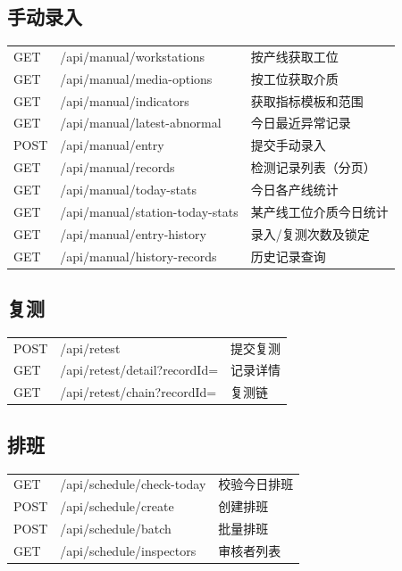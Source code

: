 \documentclass[12pt,a4paper]{ctexart}
\begin{document}
\subsection{手动录入}

\begin{tabular}{|l|l|l|}
\hline
GET & /api/manual/workstations & 按产线获取工位 \\
GET & /api/manual/media-options & 按工位获取介质 \\
GET & /api/manual/indicators & 获取指标模板和范围 \\
GET & /api/manual/latest-abnormal & 今日最近异常记录 \\
POST & /api/manual/entry & 提交手动录入 \\
GET & /api/manual/records & 检测记录列表（分页） \\
GET & /api/manual/today-stats & 今日各产线统计 \\
GET & /api/manual/station-today-stats & 某产线工位介质今日统计 \\
GET & /api/manual/entry-history & 录入/复测次数及锁定 \\
GET & /api/manual/history-records & 历史记录查询 \\
\hline
\end{tabular}

\subsection{复测}

\begin{tabular}{|l|l|l|}
\hline
POST & /api/retest & 提交复测 \\
GET & /api/retest/detail?recordId= & 记录详情 \\
GET & /api/retest/chain?recordId= & 复测链 \\
\hline
\end{tabular}

\subsection{排班}

\begin{tabular}{|l|l|l|}
\hline
GET & /api/schedule/check-today & 校验今日排班 \\
POST & /api/schedule/create & 创建排班 \\
POST & /api/schedule/batch & 批量排班 \\
GET & /api/schedule/inspectors & 审核者列表 \\
\hline
\end{tabular}
\end{document}
